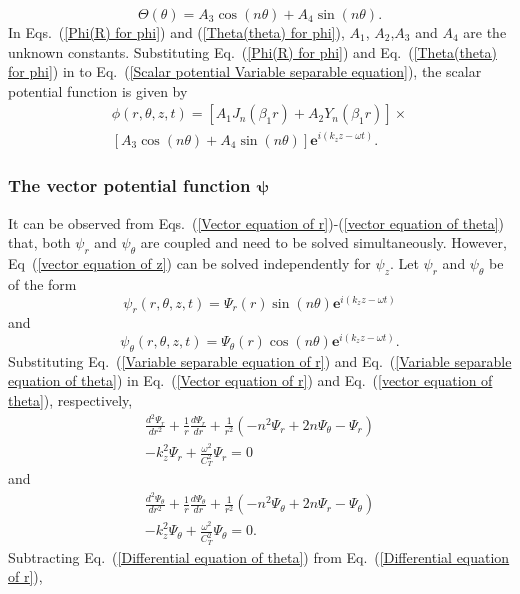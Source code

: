 \documentclass[twocolumn,10pt]{asme2ej}
\begin{document}
\begin{equation}\label{Theta(theta) for phi}
    \Theta(\theta) = A_{3}\cos(n\theta) + A_{4}\sin(n\theta).
\end{equation}
In Eqs.~(\ref{Phi(R) for phi}) and (\ref{Theta(theta) for phi}), $A_1$, $A_2$,$A_3$ and $A_4$ are the unknown constants. Substituting Eq.~(\ref{Phi(R) for phi}) and Eq.~(\ref{Theta(theta) for phi}) in to Eq.~(\ref{Scalar potential Variable separable equation}), the scalar potential function is given by
\begin{multline}\label{scalar potential function 1}
    \phi(r,\theta,z,t) = \left[A_{1}J_{n}(\beta_1 r) + A_{2}Y_{n}(\beta_1 r)\right]\times\\ \left[A_{3}\cos(n\theta) + A_{4}\sin(n\theta)\right]\mathbf{e}^{i(k_{z}z-\omega t)}.
\end{multline}
\subsubsection{The  vector potential function $\pmb{\psi}$}
It can be observed from Eqs.~(\ref{Vector equation of r})-(\ref{vector equation of theta}) that, both $\psi_r$ and $\psi_\theta$ are coupled and need to be solved simultaneously. However, Eq~(\ref{vector equation of z}) can be solved independently for $\psi_z$. Let $\psi_r$ and $\psi_\theta$ be of the form
\begin{equation}\label{Variable separable equation of r}
    \psi_{r}(r,\theta,z,t) = \Psi_{r}(r)\sin(n\theta)\mathbf{e}^{i(k_{z}z-\omega t)}
\end{equation}
and
\begin{equation}\label{Variable separable equation of theta}
    \psi_{\theta}(r,\theta,z,t) = \Psi_{\theta}(r)\cos(n\theta)\mathbf{e}^{i(k_{z}z-\omega t)}.
\end{equation}
Substituting Eq.~(\ref{Variable separable equation of r}) and Eq.~(\ref{Variable separable equation of theta}) in Eq.~(\ref{Vector equation of r}) and Eq.~(\ref{vector equation of theta}), respectively,
\begin{multline}\label{Differential equation of r}
    \frac{d^{2}\Psi_{r}}{dr^{2}} + \frac{1}{r}\frac{d\Psi_{r}}{dr} + \frac{1}{r^{2}}\left(-n^{2}\Psi_{r}+2n\Psi_{\theta}-\Psi_{r}\right)\\ - k_{z}^{2}\Psi_{r} + \frac{\omega^{2}}{C_{T}^{2}}\Psi_{r} = 0
\end{multline}
and 
\begin{multline}\label{Differential equation of theta}
    \frac{d^{2}\Psi_{\theta}}{dr^{2}} + \frac{1}{r}\frac{d\Psi_{\theta}}{dr} + \frac{1}{r^{2}}\left(-n^{2}\Psi_{\theta}+2n\Psi_{r}-\Psi_{\theta}\right)\\ - k_{z}^{2}\Psi_{\theta} + \frac{\omega^{2}}{C_{T}^{2}}\Psi_{\theta} = 0.
\end{multline}
Subtracting Eq.~(\ref{Differential equation of theta}) from Eq.~(\ref{Differential equation of r}),
\end{document}
